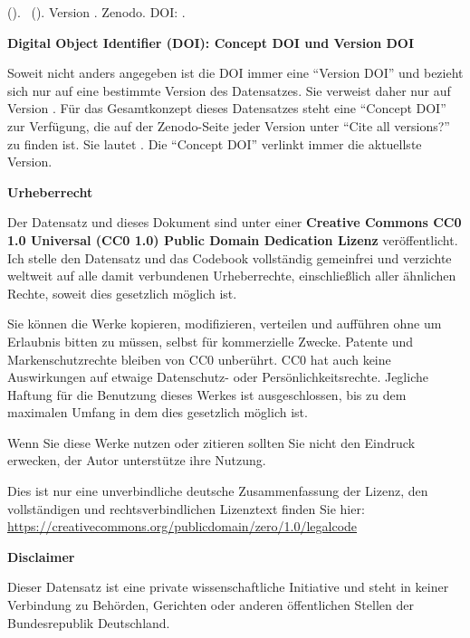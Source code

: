 \emph{\projectauthor} (\the\year ). \datatitle\ (\datashort ). Version \version . Zenodo. DOI: \dataversiondoi .


\vspace{0.5cm}


\textbf{Digital Object Identifier (DOI): Concept DOI und Version DOI}

Soweit nicht anders angegeben ist die DOI immer eine \enquote{Version DOI} und bezieht sich nur auf eine bestimmte Version des Datensatzes. Sie verweist daher nur auf Version \version . Für das Gesamtkonzept dieses Datensatzes steht eine \enquote{Concept DOI} zur Verfügung, die auf der Zenodo-Seite jeder Version unter \enquote{Cite all versions?} zu finden ist. Sie lautet \dataconceptdoi . Die \enquote{Concept DOI} verlinkt immer die aktuellste Version.


\vspace{0.5cm}


\textbf{Urheberrecht}

Der Datensatz und dieses Dokument sind unter einer \textbf{Creative Commons CC0 1.0 Universal (CC0 1.0) Public Domain Dedication Lizenz} veröffentlicht. Ich stelle den Datensatz und das Codebook vollständig gemeinfrei und verzichte weltweit auf alle damit verbundenen Urheberrechte, einschließlich aller ähnlichen Rechte, soweit dies gesetzlich möglich ist. 

Sie können die Werke kopieren, modifizieren, verteilen und aufführen ohne um Erlaubnis bitten zu müssen, selbst für kommerzielle Zwecke. Patente und Markenschutzrechte bleiben von CC0 unberührt. CC0 hat auch keine Auswirkungen auf etwaige Datenschutz- oder Persönlichkeitsrechte. Jegliche Haftung für die Benutzung dieses Werkes ist ausgeschlossen, bis zu dem maximalen Umfang in dem dies gesetzlich möglich ist. 

Wenn Sie diese Werke nutzen oder zitieren sollten Sie nicht den Eindruck erwecken, der Autor unterstütze ihre Nutzung.

Dies ist nur eine unverbindliche deutsche Zusammenfassung der Lizenz, den vollständigen und rechtsverbindlichen Lizenztext finden Sie hier: \url{https://creativecommons.org/publicdomain/zero/1.0/legalcode}



\vspace{0.5cm}



\textbf{Disclaimer} 

Dieser Datensatz ist eine private wissenschaftliche Initiative und steht in keiner Verbindung zu Behörden, Gerichten oder anderen öffentlichen Stellen der Bundesrepublik Deutschland.




\newpage